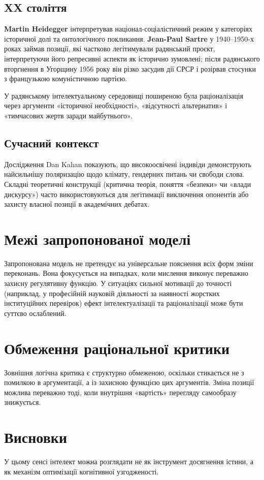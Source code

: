 \documentclass[12pt,a4paper]{article}
\begin{document}
\subsection{XX століття}
\textbf{Martin Heidegger} інтерпретував націонал-соціалістичний режим у категоріях історичної долі та онтологічного покликання. \textbf{Jean-Paul Sartre} у 1940--1950-х роках займав позиції, які частково легітимували радянський проєкт, інтерпретуючи його репресивні аспекти як історично зумовлені; після радянського вторгнення в Угорщину 1956 року він різко засудив дії СРСР і розірвав стосунки з французькою комуністичною партією.

У радянському інтелектуальному середовищі поширеною була раціоналізація через аргументи «історичної необхідності», «відсутності альтернатив» і «тимчасових жертв заради майбутнього».

\subsection{Сучасний контекст}
Дослідження Dan Kahan \cite{kahan2013} показують, що високоосвічені індивіди демонструють найсильнішу поляризацію щодо клімату, гендерних питань чи свободи слова. Складні теоретичні конструкції (критична теорія, поняття «безпеки» чи «влади дискурсу») часто використовуються для легітимації виключення опонентів або захисту власної позиції в академічних дебатах.

\section{Межі запропонованої моделі}
Запропонована модель не претендує на універсальне пояснення всіх форм зміни переконань. Вона фокусується на випадках, коли мислення виконує переважно захисну регулятивну функцію. У ситуаціях сильної мотивації до точності (наприклад, у професійній науковій діяльності за наявності жорстких інституційних перевірок) ефект інтелектуалізації та раціоналізації може бути суттєво ослаблений.

\section{Обмеження раціональної критики}
Зовнішня логічна критика є структурно обмеженою, оскільки стикається не з помилкою в аргументації, а із захисною функцією цих аргументів. Зміна позиції можлива переважно тоді, коли внутрішня «вартість» перегляду самообразу знижується.

\section{Висновки}
У цьому сенсі інтелект можна розглядати не як інструмент досягнення істини, а як механізм оптимізації когнітивної узгодженості.
\end{document}
